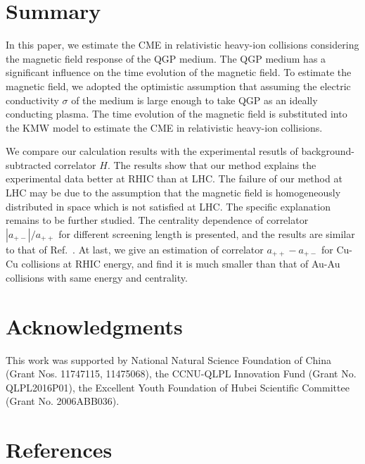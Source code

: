 \documentclass[preprint]{elsarticle}
\begin{document}
\section{Summary}\label{summary}
In this paper, we estimate the CME in relativistic heavy-ion collisions considering the magnetic field response of the QGP medium. The QGP medium has a significant influence on the time evolution of the magnetic field. To estimate the magnetic field, we adopted the optimistic assumption that assuming the electric conductivity $\sigma$ of the medium is large enough to take QGP as an ideally conducting plasma. The time evolution of the magnetic field is substituted into the KMW model to estimate the CME in relativistic heavy-ion collisions.

We compare our calculation results with the experimental resutls of background-subtracted correlator $H$. The results show that our method explains the experimental data better at RHIC than at LHC. The failure of our method at LHC may be due to the assumption that the magnetic field is homogeneously distributed in space which is not satisfied at LHC. The specific explanation remains to be further studied. The centrality dependence of correlator $|a_{+-}|/a_{++}$ for different screening length is presented, and the results are similar to that of Ref.~\cite{Kharzeev:2007jp}. At last, we give an estimation of correlator $a_{++} - a_{+-}$ for Cu-Cu collisions at RHIC energy, and find it is much smaller than that of Au-Au collisions with same energy and centrality.



\section*{Acknowledgments}
This work was supported by National Natural Science Foundation of China (Grant Nos. 11747115, 11475068), the CCNU-QLPL Innovation Fund (Grant No. QLPL2016P01), the Excellent Youth Foundation of Hubei Scientific Committee (Grant No. 2006ABB036).

\section*{References}


\end{document}
